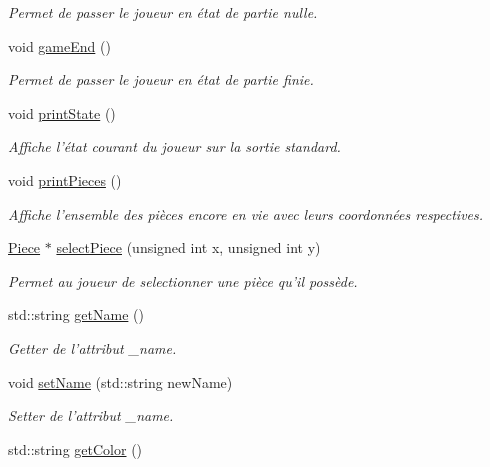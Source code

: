 \begin{DoxyCompactItemize}
\begin{DoxyCompactList}\small\item\em Permet de passer le joueur en état de partie nulle. \end{DoxyCompactList}\item 
void \hyperlink{class_player_a3e67b9ce45f196d24395b9a44cb3e140}{game\-End} ()
\begin{DoxyCompactList}\small\item\em Permet de passer le joueur en état de partie finie. \end{DoxyCompactList}\item 
void \hyperlink{class_player_a4fda4bd6b5fa84d436a7592e4faebe92}{print\-State} ()
\begin{DoxyCompactList}\small\item\em Affiche l'état courant du joueur sur la sortie standard. \end{DoxyCompactList}\item 
void \hyperlink{class_player_ac51828429e6e1401f04677ec3f1e0769}{print\-Pieces} ()
\begin{DoxyCompactList}\small\item\em Affiche l'ensemble des pièces encore en vie avec leurs coordonnées respectives. \end{DoxyCompactList}\item 
\hyperlink{class_piece}{Piece} $\ast$ \hyperlink{class_player_a777c790075ce371af98eaf6e40f2a726}{select\-Piece} (unsigned int x, unsigned int y)
\begin{DoxyCompactList}\small\item\em Permet au joueur de selectionner une pièce qu'il possède. \end{DoxyCompactList}\item 
std\-::string \hyperlink{class_player_af1aa472885d589516f483e26e786600e}{get\-Name} ()
\begin{DoxyCompactList}\small\item\em Getter de l'attribut \-\_\-name. \end{DoxyCompactList}\item 
void \hyperlink{class_player_a1b456e164e73e5cf5ffe925529fc8c2a}{set\-Name} (std\-::string new\-Name)
\begin{DoxyCompactList}\small\item\em Setter de l'attribut \-\_\-name. \end{DoxyCompactList}\item 
std\-::string \hyperlink{class_player_a3e4c06283c8cb949b338830b0d3d6abc}{get\-Color} ()

\end{DoxyCompactItemize}

